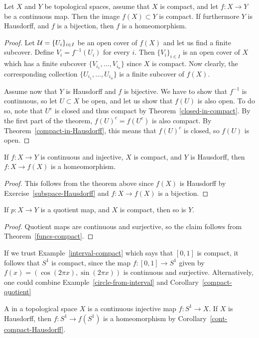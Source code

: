 \begin{thm}
  \label{funcs-compact}
  Let $X$ and $Y$ be topological spaces, assume that $X$ is compact, and let $f : X \to Y$ be a continuous map. Then the image $f(X) \subset Y$ is compact. If furthermore $Y$ is Hausdorff, and $f$ is a bijection, then $f$ is a homeomorphism.
\end{thm}
\begin{proof}
  Let $\mathcal{U} = \{U_i \}_{i \in I}$ be an open cover of $f(X)$ and let us find a finite subcover. Define $V_i = f^{-1}(U_i)$ for every $i$. Then $\{V_i\}_{i \in I}$ is an open cover of $X$ which has a finite subcover $\{V_{i_1}, \dots, V_{i_n}\}$ since $X$ is compact. Now clearly, the corresponding collection $\{U_{i_1}, \dots, U_{i_n}\}$ is a finite subcover of $f(X)$.
  
  Assume now that $Y$ is Hausdorff and $f$ is bijective. We have to show that $f^{-1}$ is continuous, so let $U \subset X$ be open, and let us show that $f(U)$ is also open. To do so, note that $U^c$ is closed and thus compact by Theorem~\ref{closed-in-compact}. By the first part of the theorem, $f(U)^c = f(U^c)$ is also compact. By Theorem~\ref{compact-in-Hausdorff}, this means that $f(U)^c$ is closed, so $f(U)$ is open.
\end{proof}
\begin{cor}
  \label{cont-compact-Hausdorff}
  If $f: X \to Y$ is continuous and injective, $X$ is compact, and $Y$ is Hausdorff, then $f : X \to f(X)$ is a homeomorphism.  
\end{cor}
\begin{proof}
  This follows from the theorem above since $f(X)$ is Hausdorff by Exercise~\ref{subspace-Hausdorff} and $f : X \to f(X)$ is a bijection.
\end{proof}
\begin{cor}
  \label{compact-quotient}
  If $p : X \to Y$ is a quotient map, and $X$ is compact, then so is $Y$.
\end{cor}
\begin{proof}
  Quotient maps are continuous and surjective, so the claim follows from Theorem~\ref{funcs-compact}.
\end{proof}
\begin{example}
  \label{s1-compact}
  If we trust Example~\ref{interval-compact} which says that $[0,1]$ is compact, it follows that $S^1$ is compact, since the map $f:[0,1] \to S^1$ given by $f(x) = (\cos(2\pi x),\sin(2\pi x))$ is continuous and surjective. Alternatively, one could combine Example~\ref{circle-from-interval} and Corollary~\ref{compact-quotient}
\end{example}
\begin{example}
  A  in a topological space $X$ is a continuous injective map $f : S^1 \to X$. If $X$ is Hausdorff, then $f : S^1 \to f(S^1)$ is a homeomorphism by Corollary~\ref{cont-compact-Hausdorff}.
\end{example}

